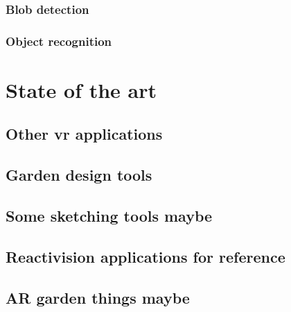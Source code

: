 			\subsubsection{Blob detection}
			\subsubsection{Object recognition}

    \section{State of the art}\label{sec:SOTA}
		\subsection{Other vr applications}
		\subsection{Garden design tools}
		\subsection{Some sketching tools maybe}
		\subsection{Reactivision applications for reference}
		\subsection{AR garden things maybe}